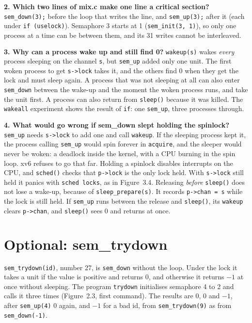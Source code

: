 \documentclass{assets/utmreport}
\begin{document}
\textbf{2. Which two lines of mix.c make one line a critical section?}
\texttt{sem\_down(3);} before the loop that writes the line, and \texttt{sem\_up(3);} after it (each under \texttt{if (uselock)}). Semaphore 3 starts at 1 (\texttt{sem\_init(3, 1)}), so only one process at a time can be between them, and its 31 writes cannot be interleaved.

\textbf{3. Why can a process wake up and still find 0?}
\texttt{wakeup(s)} wakes \emph{every} process sleeping on the channel \texttt{s}, but \texttt{sem\_up} added only one unit. The first woken process to get \texttt{s->lock} takes it, and the others find 0 when they get the lock and must sleep again. A process that was not sleeping at all can also enter \texttt{sem\_down} between the wake-up and the moment the woken process runs, and take the unit first. A process can also return from \texttt{sleep()} because it was killed. The \texttt{wakeall} experiment shows the result of \texttt{if}: one \texttt{sem\_up}, three processes through.

\textbf{4. What would go wrong if sem\_down slept holding the spinlock?}
\texttt{sem\_up} needs \texttt{s->lock} to add one and call \texttt{wakeup}. If the sleeping process kept it, the process calling \texttt{sem\_up} would spin forever in \texttt{acquire}, and the sleeper would never be woken: a deadlock inside the kernel, with a CPU burning in the spin loop. xv6 refuses to go that far. Holding a spinlock disables interrupts on the CPU, and \texttt{sched()} checks that \texttt{p->lock} is the only lock held. With \texttt{s->lock} still held it panics with \texttt{sched locks}, as in Figure~3.4. Releasing \emph{before} \texttt{sleep()} does not lose a wake-up, because of \texttt{sleep\_prepare(s)}. It records \texttt{p->chan = s} while the lock is still held. If \texttt{sem\_up} runs between the release and \texttt{sleep()}, its \texttt{wakeup} clears \texttt{p->chan}, and \texttt{sleep()} sees 0 and returns at once.

\chapter{Optional: sem\_trydown}
\texttt{sem\_trydown(id)}, number 27, is \texttt{sem\_down} without the loop. Under the lock it takes a unit if the value is positive and returns 0, and otherwise it returns $-1$ at once without sleeping. The program \texttt{trydown} initialises semaphore 4 to 2 and calls it three times (Figure~2.3, first command). The results are 0, 0 and $-1$, after \texttt{sem\_up(4)} 0 again, and $-1$ for a bad id, from \texttt{sem\_trydown(9)} as from \texttt{sem\_down(-1)}.
\end{document}
